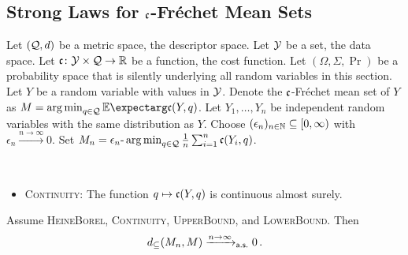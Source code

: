 \subsection{Strong Laws for $\mathfrak{c}$-Fréchet Mean Sets}\label{ssec:alt:gen}
%
Let $(\mathcal{Q}, d)$ be a metric space, the descriptor space. Let $\mathcal{Y}$ be a set, the data space. Let $\mathfrak{c}\colon \mathcal{Y} \times\mathcal{Q} \to \mathbb{R}$ be a function, the cost function. Let $(\Omega, \Sigma, \Pr)$ be a probability space that is silently underlying all random variables in this section. Let $Y$ be a random variable with values in $\mathcal{Y}$. Denote the $\mathfrak{c}$-Fréchet mean set of $Y$ as $M = \argmin_{q\in\mc Q} \Ex{\mf c(Y, q)}$.
Let $Y_1, \dots, Y_n$ be independent random variables with the same distribution as $Y$.
Choose $(\epsilon_n)_{n\in\mathbb{N}}\subseteq [0,\infty)$ with $\epsilon_n \xrightarrow{n\to\infty}0$. Set $M_n = \epsilon_n\text{-}\operatorname*{arg\,min}_{q\in\mathcal{Q}} \frac1n \sum_{i=1}^n \mathfrak{c}(Y_i, q)$.
%
\begin{assumptions}\mbox{ }
\begin{itemize}
	\item \textsc{Continuity}:  The function $q \mapsto \mathfrak{c}(Y, q)$ is continuous almost surely.
	\end{itemize}
\end{assumptions}
%
\begin{theorem}\label{thm:alt:consistency}
	Assume \textsc{HeineBorel}, \textsc{Continuity}, \textsc{UpperBound}, and \textsc{LowerBound}. Then
	\begin{equation*}
		d_\subseteq(M_n, M) \xrightarrow{n\to\infty}_{\mathsf{a.s.}} 0
		\, .
	\end{equation*}
\end{theorem}
%

